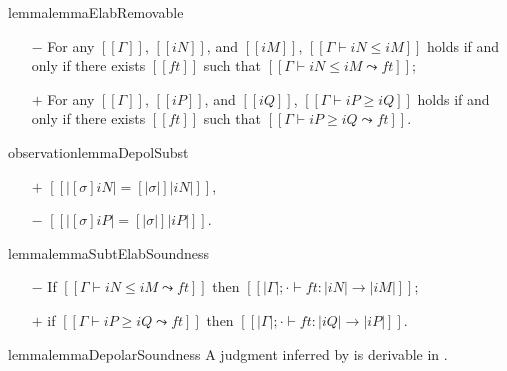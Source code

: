 \begin{restatable}{lemma}{lemmaElabRemovable}
  \label{lemma:elab-removable}
  \hfill
  \begin{itemize}
    \item [$-$] For any $[[Γ]]$, $[[iN]]$, and $[[iM]]$, 
      $[[Γ ⊢ iN ≤ iM]]$ holds if and only if 
      there exists $[[ft]]$ such that $[[Γ ⊢ iN ≤ iM ⤳ ft]]$;
    \item [$+$] For any $[[Γ]]$, $[[iP]]$, and $[[iQ]]$, 
      $[[Γ ⊢ iP ≥ iQ]]$ holds if and only if
      there exists $[[ft]]$ such that $[[Γ ⊢ iP ≥ iQ ⤳ ft]]$.
  \end{itemize}
\end{restatable}



\begin{restatable}{observation}{lemmaDepolSubst}
  \label{lemma:depol-subst}
  \hfill
  \begin{itemize}
    \item [$+$] $[[ |[σ]iN| = [|σ|]|iN| ]]$,
    \item [$-$] $[[ |[σ]iP| = [|σ|]|iP| ]]$.
  \end{itemize}
\end{restatable}


\begin{restatable}{lemma}{lemmaSubtElabSoundness}
  \label{lemma:subt-elab-soundness}
  \hfill
  \begin{itemize}
    \item [$-$] If $[[Γ ⊢ iN ≤ iM ⤳ ft]]$ then $[[|Γ| ; · ⊢ ft : |iN| → |iM| ]]$;
    \item [$+$] if $[[Γ ⊢ iP ≥ iQ ⤳ ft]]$ then $[[|Γ| ; · ⊢ ft : |iQ| → |iP| ]]$.
  \end{itemize}
\end{restatable}


\begin{restatable}{lemma}{lemmaDepolarSoundness}
  \label{lemma:depolar-soundness}
  A judgment inferred by \fexists is derivable in \systemf.\\
\end{restatable}

